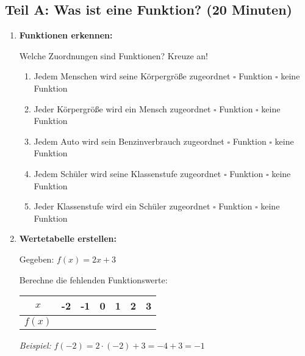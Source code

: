 \subsection*{Teil A: Was ist eine Funktion? (20 Minuten)}

\begin{enumerate}[label=\arabic*.]

    \item \textbf{Funktionen erkennen:}

    Welche Zuordnungen sind Funktionen? Kreuze an!

    \vspace{0.5cm}
    \begin{enumerate}[label=\alph*)]
        \item Jedem Menschen wird seine Körpergröße zugeordnet \hspace{1cm} $\square$ Funktion \hspace{1cm} $\square$ keine Funktion

        \item Jeder Körpergröße wird ein Mensch zugeordnet \hspace{1cm} $\square$ Funktion \hspace{1cm} $\square$ keine Funktion

        \item Jedem Auto wird sein Benzinverbrauch zugeordnet \hspace{1cm} $\square$ Funktion \hspace{1cm} $\square$ keine Funktion

        \item Jedem Schüler wird seine Klassenstufe zugeordnet \hspace{1cm} $\square$ Funktion \hspace{1cm} $\square$ keine Funktion

        \item Jeder Klassenstufe wird ein Schüler zugeordnet \hspace{1cm} $\square$ Funktion \hspace{1cm} $\square$ keine Funktion
    \end{enumerate}

    \vspace{1cm}

    \item \textbf{Wertetabelle erstellen:}

    Gegeben: $f(x) = 2x + 3$

    Berechne die fehlenden Funktionswerte:

    \begin{center}
        \begin{tabular}{|c|c|c|c|c|c|c|}
            \hline
            $x$ & -2 & -1 & 0 & 1 & 2 & 3 \\
            \hline
            $f(x)$ & & & & & & \\
            \hline
        \end{tabular}
    \end{center}

    \textit{Beispiel:} $f(-2) = 2 \cdot (-2) + 3 = -4 + 3 = -1$

    \vspace{1cm}

\end{enumerate}